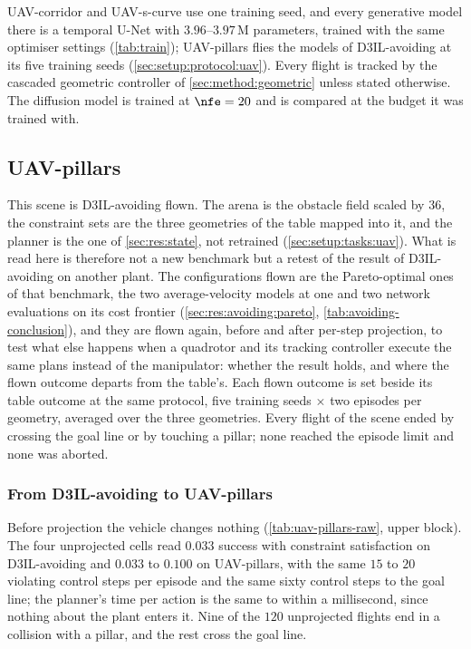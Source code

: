 UAV-corridor and UAV-s-curve use one training seed, and every generative model there is a temporal U-Net
with $3.96$--$3.97$\,M parameters, trained with the same optimiser settings (\autoref{tab:train});
UAV-pillars flies the models of D3IL-avoiding at its five training seeds (\autoref{sec:setup:protocol:uav}).
Every flight is tracked by the cascaded geometric controller of \autoref{sec:method:geometric} unless
stated otherwise. The diffusion
model is trained at $\nfe=20$ and is compared at the budget it was trained with.

\subsection{UAV-pillars}\label{sec:res:uav:pillars}

This scene is D3IL-avoiding flown. The arena is the obstacle field scaled by $36$, the constraint sets are
the three geometries of the table mapped into it, and the planner is the one of \autoref{sec:res:state},
not retrained (\autoref{sec:setup:tasks:uav}). What is read here is therefore not a new benchmark but a
retest of the result of D3IL-avoiding on another plant. The configurations flown are the Pareto-optimal ones
of that benchmark, the two average-velocity models at one and two network evaluations on its cost frontier
(\autoref{sec:res:avoiding:pareto}, \autoref{tab:avoiding-conclusion}), and they are flown again, before and
after per-step projection, to test what else happens when a quadrotor and its tracking controller execute the
same plans instead of the manipulator: whether the result holds, and where the flown outcome departs from the
table's. Each flown outcome is set beside its table outcome at the same protocol, five training seeds $\times$
two episodes per geometry, averaged over the three geometries. Every flight of the scene ended by crossing the goal line
or by touching a pillar; none reached the episode limit and none was aborted.

\subsubsection{From D3IL-avoiding to UAV-pillars}\label{sec:res:uav:models}

Before projection the vehicle changes nothing (\autoref{tab:uav-pillars-raw}, upper block). The four
unprojected cells read $0.033$ success with constraint satisfaction on D3IL-avoiding and $0.033$ to
$0.100$ on UAV-pillars, with the same $15$ to $20$ violating control steps per episode and the same sixty
control steps to the goal line; the planner's time per action is the same to within a millisecond, since
nothing about the plant enters it. Nine of the $120$ unprojected flights end in a collision with a pillar,
and the rest cross the goal line.

